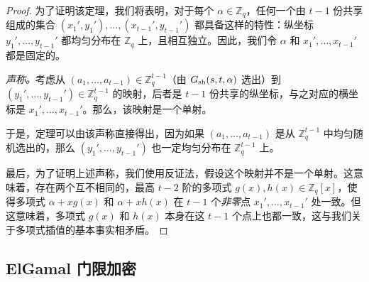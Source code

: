 \begin{proof}
为了证明该定理，我们将表明，对于每个 $\alpha\in\mathbb{Z}_q$，任何一个由 $t-1$ 份共享组成的集合 $(x_1',y_1'),\dots,\allowbreak (x_{t-1}',y_{t-1}')$ 都具备这样的特性：纵坐标 $y_1',\dots,y_{t-1}'$ 都均匀分布在 $\mathbb{Z}_q$ 上，且相互独立。因此，我们令 $\alpha$ 和 $x_1',\dots,x_{t-1}'$ 都是固定的。 

\emph{声称。}考虑从 $(a_1,\dots,a_{t-1})\in\mathbb{Z}_q^{t-1}$（由 $G_{\rm sh}(s,t,\alpha)$ 选出）到 $(y_1',\dots,y_{t-1}')\in\mathbb{Z}_q^{t-1}$ 的映射，后者是 $t-1$ 份共享的纵坐标，与之对应的横坐标是 $x_1',\dots,x_{t-1}'$。那么，该映射是一个单射。

于是，定理可以由该声称直接得出，因为如果 $(a_1,\dots,a_{t-1})$ 是从 $\mathbb{Z}_q^{t-1}$ 中均匀随机选出的，那么 $(y_1',\dots,y_{t-1}')$ 也一定均匀分布在 $\mathbb{Z}_q^{t-1}$ 上。

最后，为了证明上述声称，我们使用反证法，假设这个映射并不是一个单射。这意味着，存在两个互不相同的，最高 $t-2$ 阶的多项式 $g(x),h(x)\in\mathbb{Z}_q[x]$，使得多项式 $\alpha+xg(x)$ 和 $\alpha+xh(x)$ 在 $t-1$ 个\emph{非零}点 $x_1',\dots,x_{t-1}'$ 处一致。但这意味着，多项式 $g(x)$ 和 $h(x)$ 本身在这 $t-1$ 个点上也都一致，这与我们关于多项式插值的基本事实相矛盾。
\end{proof}

\subsection{ElGamal 门限加密}\label{subsec:11-6-2}

\begin{game}[门限加密的语义安全性]\label{game:11-4}
	
\end{game}

\begin{definition}[门限加密的语义安全性]\label{def:11-9}
	
\end{definition}

\begin{theorem}\label{theo:11-7}
	
\end{theorem}